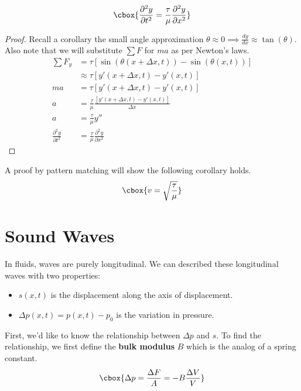 \documentclass{hw}
\renewcommand\emph[1]{{\bf\color{BlueViolet}#1}}
\begin{document}
\begin{claim}
\[\cbox{
  \frac{\partial^2 y}{\partial t^2} = \frac{\tau}{\mu} \frac{\partial^2 y}{\partial x^2}
}\]
\begin{proof}
Recall a corollary the small angle approximation $\theta \approx 0 \implies
\frac{dy}{dx} \approx \tan(\theta)$. Also note that we will substitute $\sum F$
for $ma$ as per Newton's laws. 
\begin{align*}
  \sum F_y &= \tau\left[\sin(\theta(x + \Delta x, t)) - \sin(\theta(x, t)) \right] \\
           &\approx \tau \left[ y'(x + \Delta x, t) - y'(x, t) \right] \\
  ma       &= \tau \left[ y'(x + \Delta x, t) - y'(x, t) \right] \\
  a        &= \frac{\tau}{\mu} \frac{\left[ y'(x + \Delta x, t) - y'(x, t) \right]}
                {\Delta x} \\
  a        &= \frac{\tau}{\mu} y'' \\
  \frac{\partial^2 y}{\partial t^2} &= \frac{\tau}{\mu} \frac{\partial^2 y}{\partial x^2}
\end{align*}
\end{proof}
\end{claim}

A proof by pattern matching will show the following corollary holds.
\[
  \cbox{v = \sqrt{\frac{\tau}{\mu}}}
\]

\section{Sound Waves} 
In fluids, waves are purely longitudinal. We can described these longitudinal
waves with two properties:
\begin{itemize}
  \item $s(x,t)$ is the displacement along the axis of displacement.
  \item $\Delta p(x,t) = p(x,t) - p_0$ is the variation in pressure.
\end{itemize}

First, we'd like to know the relationship between $\Delta p$ and $s$. To find
the relationship, we first define the \emph{bulk modulus} $B$ which is the
analog of a spring constant.
\[\cbox{
  \Delta p = \frac{\Delta F}{A} = -B \frac{\Delta V}{V}
}\]
\end{document}
